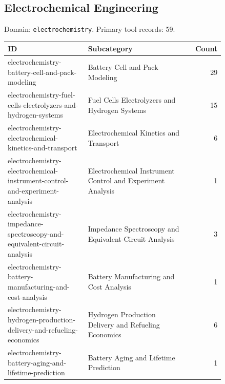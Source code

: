 \subsection{Electrochemical Engineering}
\noindent Domain: \texttt{electrochemistry}. Primary tool records: 59.
\begin{longtable}{p{0.37\linewidth}p{0.47\linewidth}r}
ID & Subcategory & Count\\\hline\endhead
electrochemistry-battery-cell-and-pack-modeling & Battery Cell and Pack Modeling & 29\\
electrochemistry-fuel-cells-electrolyzers-and-hydrogen-systems & Fuel Cells Electrolyzers and Hydrogen Systems & 15\\
electrochemistry-electrochemical-kinetics-and-transport & Electrochemical Kinetics and Transport & 6\\
electrochemistry-electrochemical-instrument-control-and-experiment-analysis & Electrochemical Instrument Control and Experiment Analysis & 1\\
electrochemistry-impedance-spectroscopy-and-equivalent-circuit-analysis & Impedance Spectroscopy and Equivalent-Circuit Analysis & 3\\
electrochemistry-battery-manufacturing-and-cost-analysis & Battery Manufacturing and Cost Analysis & 1\\
electrochemistry-hydrogen-production-delivery-and-refueling-economics & Hydrogen Production Delivery and Refueling Economics & 6\\
electrochemistry-battery-aging-and-lifetime-prediction & Battery Aging and Lifetime Prediction & 1\\
\end{longtable}
